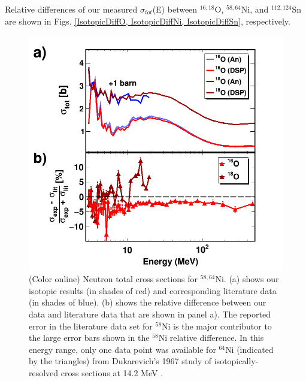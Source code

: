 \documentclass[twocolumn,secnumarabic,amssymb, nobibnotes, aps, prl,
superscriptaddress, nobalancelastpage]{revtex4}
\newcommand{\totEs}{\ensuremath{\sigma_{tot}}(E)\,\,}
\begin{document}
Relative differences of our measured \totEs between $^{16,18}$O, $^{58,64}$Ni, and
$^{112,124}$Sn are shown in Figs. \ref{IsotopicDiffO, IsotopicDiffNi, 
IsotopicDiffSn}, respectively. 
\begin{figure}
    \includegraphics[scale=0.35]{figures/TwoPanelO.png}
    \caption{(Color online) Neutron total cross sections for $^{58,64}$Ni.
        (a) shows our isotopic results (in shades of red) and
        corresponding literature data \cite{Perey1993, Dukarevich1967} (in
        shades of blue). (b) shows the relative difference between our data
        and literature data that are shown in panel a). The reported error in
        the literature data set for $^{58}$Ni is the major contributor to the
        large error bars shown in the $^{58}$Ni relative difference. In this
        energy range, only one data point was available for $^{64}$Ni (indicated
        by the triangles) from Dukarevich's 1967 study of isotopically-resolved cross
        sections at 14.2 MeV \cite{Dukarevich1967}.
    }
    \label{TwoPanelO}
\end{figure}
\end{document}
